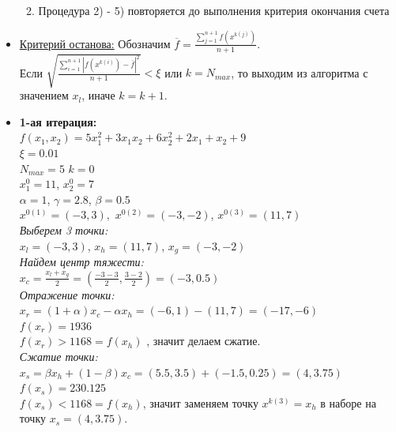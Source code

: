 \begin{itemize}
\begin{enumerate}
\begin{itemize}
        \end{itemize}

        \item Процедура 2) - 5) повторяется до выполнения критерия окончания счета
        
    \end{enumerate} 

    \item \underline{Критерий останова:} Обозначим $\overline{f} = \displaystyle\frac{\displaystyle\sum\limits^{n+1}_{j=1} f(x^{k(j)})}{n + 1}$. \\ 
        Если $\sqrt{\displaystyle\frac{\displaystyle\sum\limits^{n+1}_{i=1} \left|f(x^{k(i)}) - \overline{f}\right|^2}{n + 1}} < \xi$ или $k = N_{max}$, то выходим из алгоритма с значением $x_l$, иначе $k = k + 1$.
    
    \item {\bfseries 1-ая итерация:} \\
    $f(x_1, x_2) = 5x^{2}_{1} + 3x_{1}x_{2} + 6x^{2}_{2} + 2x_1 + x_2 + 9$ \\ 
    $\xi = 0.01$\\
    $N_{max} = 5$
    $k = 0$ \\
    $x^{0}_1 = 11$, $x^{0}_2 = 7$\\
    $\alpha = 1$, $\gamma = 2.8$, $\beta = 0.5$\\
    $x^{0(1)} = (-3, 3),$ $x^{0(2)} = (-3, -2)$, $x^{0(3)} = (11, 7)$\\
    
    {\it Выберем 3 точки:} \\
    $x_l = (-3, 3)$, $x_h = (11, 7)$, $x_g = (-3, -2)$ \\
    
    {\it Найдем центр тяжести:} \\
    $x_c = \displaystyle\frac{x_l + x_g}{2} = (\displaystyle\frac{-3 - 3}{2}, \displaystyle\frac{3 - 2}{2}) = (-3, 0.5)$\\
    
    {\it Отражение точки:} \\
    $x_r = (1 + \alpha)x_c - \alpha x_h = (-6, 1) - (11, 7) = (-17, -6)$\\
    $f(x_r) = 1936$ \\
    $f(x_r) > 1168 = f(x_h)$ , значит делаем сжатие. \\
    
    {\it Сжатие точки:} \\
    $x_s = \beta x_h + (1 - \beta)x_c = (5.5, 3.5) + (-1.5, 0.25) = (4, 3.75)$\\
    $f(x_s) = 230.125$ \\
    $f(x_s) < 1168 = f(x_h)$, значит заменяем точку $x^{k(3)} = x_h$ в наборе на точку $x_s = (4, 3.75)$. \\
    

\end{itemize}
